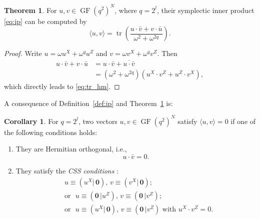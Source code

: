 \documentclass{ieeeaccess}
\DeclareMathOperator{\GF}{GF}
\DeclareMathOperator{\tr}{tr}
\newcommand{\mbf}[1]{\pmb{#1}}
\let\emph\textit
\theoremstyle{definition}		%
\newtheorem{theorem}{Theorem}
\newtheorem{corollary}{Corollary}
\newcommand{\bmark}[1]{{\color{blue} #1}}
\begin{document}
\begin{theorem} \label{thm:Herm} \cite{MU00,KKKS06}
	For $u,v\in\GF(q^2)^N$,  {where $q=2^l$,} their symplectic inner product \eqref{eq:ip} can be computed by 
	\begin{equation}\label{eq:tr_hm}
	\langle u,v \rangle = \tr\left(\frac{u\cdot \bar v + v\cdot \bar u}{\omega^2 + \omega^{2q}}\right).
	\end{equation}
\end{theorem}
\begin{proof}
	Write $u=\omega u^X+\omega^q u^Z$ and $v=\omega v^X+\omega^q v^Z$. Then
	\begin{equation} \label{eq:hm2}
	\begin{aligned}
	u\cdot \bar v + v\cdot \bar u &= u\cdot \bar v  + \overline{u\cdot \bar v}  \\ 
	&=(\omega^2 + \omega^{2q})(u^X\cdot v^Z + u^Z\cdot v^X),
	\end{aligned}
	\end{equation}
	which directly leads to \eqref{eq:tr_hm}.
\end{proof}
%
A consequence of Definition~\ref{def:ip} and Theorem~\ref{thm:Herm} is:
\begin{corollary} \label{col:h2ip}
	 {For $q=2^l$,} two vectors ${u,v\in\GF(q^2)^N}$ satisfy ${\langle u,v \rangle=0 }$ if one of the following conditions holds:
	 \begin{enumerate}
	 	\item   They are Hermitian orthogonal, i.e.,
	 	\begin{equation} \label{eq:h_0}
	 	u\cdot \bar v = 0.
	 	\end{equation}
		\item  They satisfy the \emph{CSS conditions} \mbox{\cite{CS96,Steane96}}:
		\begin{equation} \label{eq:css_0}
		\begin{aligned}
		& u\equiv(u^X|\,\mbf 0),\, v\equiv(v^X|\,\mbf 0); \\ 
		&\text{or~~} u\equiv(\mbf 0\,|u^Z),\, v\equiv(\mbf 0\,|v^Z); \\ 
		&\text{or~~} u\equiv(u^X|\,\mbf 0),\, v\equiv(\mbf 0\,|v^Z) \text{~with~} u^X\cdot v^Z =0. 
		\end{aligned}
		\end{equation}
	 \end{enumerate}
\end{corollary}
\end{document}
